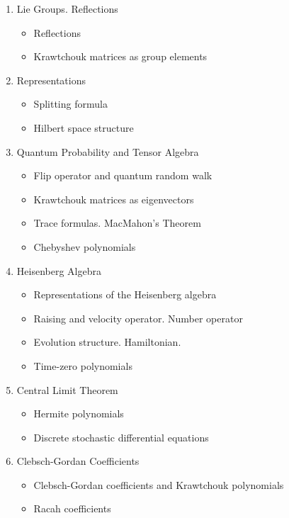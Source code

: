 \documentclass[12pt]{article}
\numberwithin{equation}{section}
\begin{document}
\begin{enumerate}
\item Lie Groups. Reflections  

 
\begin{itemize}
\item  Reflections 
\item  Krawtchouk matrices as group elements 
 \end{itemize}

\item Representations   

 
\begin{itemize}
\item   Splitting formula 
\item  Hilbert space structure 
 \end{itemize}

\item Quantum Probability and Tensor Algebra  

  
\begin{itemize}
\item Flip operator and quantum random walk 
\item  Krawtchouk matrices as eigenvectors 
\item  Trace formulas. MacMahon's Theorem  
\item  Chebyshev polynomials  
 \end{itemize}

\item Heisenberg Algebra   

 
\begin{itemize}
\item  Representations of the Heisenberg algebra 
\item  Raising and velocity operator. Number operator 
\item Evolution structure. Hamiltonian. 
\item Time-zero polynomials 
 \end{itemize}

\item Central Limit Theorem  

 
\begin{itemize}
\item  Hermite polynomials 
\item  Discrete stochastic differential equations 
 \end{itemize}

\item Clebsch-Gordan Coefficients
\begin{itemize}
\item   Clebsch-Gordan coefficients and Krawtchouk polynomials 
\item  Racah coefficients 
 \end{itemize}


\end{enumerate}
\end{document}
